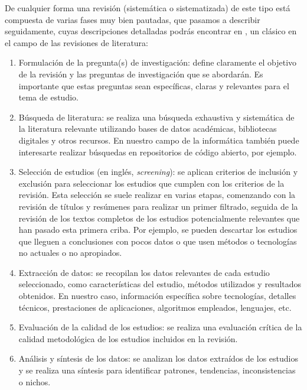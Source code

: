 De cualquier forma una revisión (sistemática o sistematizada) de este tipo está compuesta de varias fases muy bien pautadas, que pasamos a describir seguidamente, cuyas descripciones detalladas podrás encontrar en  \cite{booth2021a}, un clásico en el campo de las revisiones de literatura:

\begin{enumerate}
\item Formulación de la pregunta(s) de investigación: define claramente el objetivo de la revisión y las preguntas de investigación que se abordarán. Es importante que estas preguntas sean específicas, claras y relevantes para el tema de estudio.

\item Búsqueda de literatura: se realiza una búsqueda exhaustiva y sistemática de la literatura relevante utilizando bases de datos académicas, bibliotecas digitales y otros recursos. En nuestro campo de la informática también puede interesarte realizar búsquedas en repositorios de código abierto, por ejemplo.

\item Selección de estudios (en inglés, \textit{screening}): se aplican criterios de inclusión y exclusión para seleccionar los estudios que cumplen con los criterios de la revisión. Esta selección se suele realizar en varias etapas, comenzando con la revisión de títulos y resúmenes para realizar un primer filtrado, seguida de la revisión de los textos completos de los estudios potencialmente relevantes que han pasado esta primera criba. Por ejemplo, se pueden descartar los estudios que lleguen a conclusiones con pocos datos o que usen métodos o tecnologías no actuales o no apropiados. 

\item Extracción de datos: se recopilan los datos relevantes de cada estudio seleccionado, como características del estudio, métodos utilizados y resultados obtenidos. En nuestro caso, información específica sobre tecnologías, detalles técnicos, prestaciones de aplicaciones, algoritmos empleados, lenguajes, etc.

\item Evaluación de la calidad de los estudios: se realiza una evaluación crítica de la calidad metodológica de los estudios incluidos en la revisión. 

\item Análisis y síntesis de los datos: se analizan los datos extraídos de los estudios y se realiza una síntesis para identificar patrones, tendencias, inconsistencias o nichos.


\end{enumerate}
